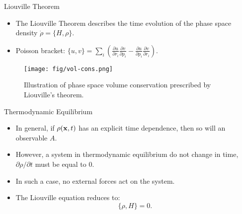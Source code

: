 \documentclass[10pt]{beamer}
\begin{document}
\begin{frame}{Liouville Theorem}
\begin{itemize}
\setlength\itemsep{1em}
  \item The Liouville Theorem describes the time evolution of the phase space density $\dot{\rho} = \{H, \rho\}$.

  \item Poisson bracket: $\{u,v\} = \sum_i \left( \frac{\partial{u}}{\partial{r}_i}\frac{\partial{v}}{\partial{p}_i} - \frac{\partial{u}}{\partial{p}_i}\frac{\partial{v}}{\partial{r}_i} \right)$.
\end{itemize}
\begin{figure}
\centering
  \texttt{[image: fig/vol-cons.png]}
  \caption{Illustration of phase space volume conservation prescribed by Liouville's theorem.}
\end{figure}
\end{frame}

\begin{frame}{Thermodynamic Equilibrium}
\begin{itemize}
\setlength\itemsep{1em}
  \item In general, if $\rho({\bf x}, t)$ has an explicit time dependence, then so will an observable $A$.
  \item However, a system in thermodynamic equilibrium do not change in time, $\partial{\rho}/\partial{t}$ must be equal to 0.
  \item In such a case, no external forces act on the system.
  \item The Liouville equation reduces to:
  \begin{equation}
    \label{eq:eq-liouville}
    \{ \rho, H \} = 0.
  \end{equation}
\end{itemize}
\end{frame}
\end{document}
